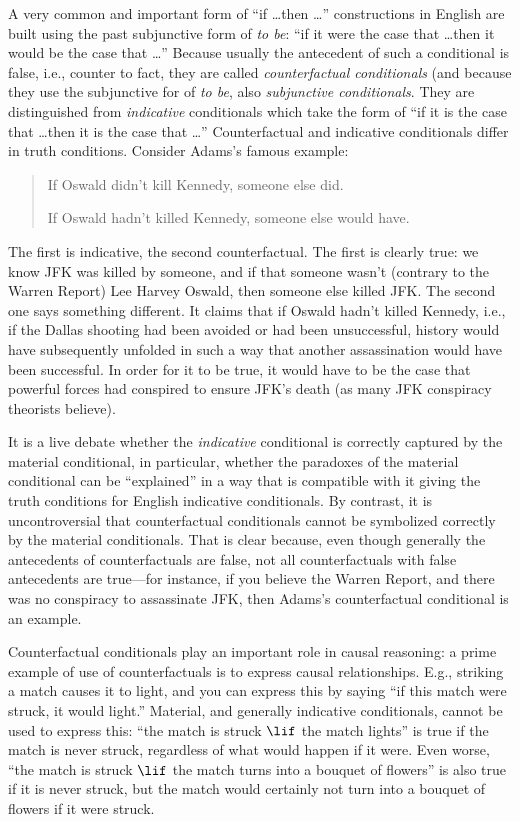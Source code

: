 \documentclass[../../../include/open-logic-section]{subfiles}
\begin{document}


A very common and important form of ``if \dots then \dots''
constructions in English are built using the past subjunctive form of
\emph{to be}: ``if it were the case that \dots then it would be the
case that \dots'' Because usually the antecedent of such a conditional
is false, i.e., counter to fact, they are called \emph{counterfactual
  conditionals} (and because they use the subjunctive for of \emph{to
  be}, also \emph{subjunctive conditionals}. They are distinguished
from \emph{indicative} conditionals which take the form of ``if it is
the case that \dots then it is the case that \dots'' Counterfactual and
indicative conditionals differ in truth conditions. Consider Adams's
famous example:
\begin{quote}
  If Oswald didn't kill Kennedy, someone else did.
  
  If Oswald hadn't killed Kennedy, someone else would have.
\end{quote}
The first is indicative, the second counterfactual. The first is
clearly true: we know JFK was killed by someone, and if that someone
wasn't (contrary to the Warren Report) Lee Harvey Oswald, then someone
else killed JFK. The second one says something different. It claims
that if Oswald hadn't killed Kennedy, i.e., if the Dallas shooting had
been avoided or had been unsuccessful, history would have subsequently
unfolded in such a way that another assassination would have been
successful. In order for it to be true, it would have to be the case
that powerful forces had conspired to ensure JFK's death (as many JFK
conspiracy theorists believe).

It is a live debate whether the \emph{indicative} conditional is
correctly captured by the material conditional, in particular, whether
the paradoxes of the material conditional can be ``explained'' in a
way that is compatible with it giving the truth conditions for English
indicative conditionals. By contrast, it is uncontroversial that
counterfactual conditionals cannot be symbolized correctly by the
material conditionals. That is clear because, even though generally
the antecedents of counterfactuals are false, not all counterfactuals
with false antecedents are true---for instance, if you believe the
Warren Report, and there was no conspiracy to assassinate JFK, then
Adams's counterfactual conditional is an example.

Counterfactual conditionals play an important role in causal
reasoning: a prime example of use of counterfactuals is to express
causal relationships. E.g., striking a match causes it to light, and
you can express this by saying ``if this match were struck, it would
light.''  Material, and generally indicative conditionals, cannot be
used to express this: ``the match is struck $\lif$ the match lights''
is true if the match is never struck, regardless of what would happen
if it were. Even worse, ``the match is struck $\lif$ the match turns
into a bouquet of flowers'' is also true if it is never struck, but
the match would certainly not turn into a bouquet of flowers if it
were struck.
\end{document}
